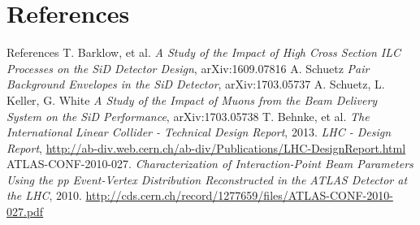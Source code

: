 \documentclass[xcolor={dvipsnames}]{beamer}
\begin{document}
\section*{References}
\begin{thebibliography}{9}
\begin{frame}{References}
 T. Barklow, et al. \emph{A Study of the Impact of High Cross Section ILC Processes on the SiD Detector Design}, arXiv:1609.07816
 A. Schuetz \emph{Pair Background Envelopes in the SiD Detector}, arXiv:1703.05737
 A. Schuetz, L. Keller, G. White \emph{A Study of the Impact of Muons from the Beam Delivery System on the SiD Performance}, arXiv:1703.05738
 T. Behnke, et al.
\emph{The International Linear Collider - Technical Design Report}, 2013.
 \emph{LHC - Design Report}, \url{http://ab-div.web.cern.ch/ab-div/Publications/LHC-DesignReport.html}
 ATLAS-CONF-2010-027. \emph{Characterization of Interaction-Point Beam Parameters Using the pp Event-Vertex Distribution Reconstructed in the ATLAS Detector at the LHC}, 2010. \url{http://cds.cern.ch/record/1277659/files/ATLAS-CONF-2010-027.pdf}
\end{frame}
\end{thebibliography}

\end{document}
